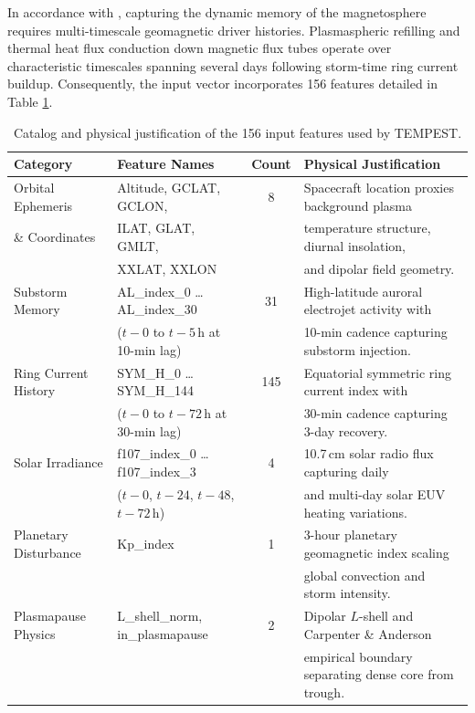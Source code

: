 \documentclass{agujournal2019}
\begin{document}
In accordance with \cite{dutta_statistical_2022}, capturing the dynamic memory of the magnetosphere requires multi-timescale geomagnetic driver histories. Plasmaspheric refilling and thermal heat flux conduction down magnetic flux tubes operate over characteristic timescales spanning several days following storm-time ring current buildup. Consequently, the input vector incorporates 156 features detailed in Table \ref{tab:features}.

\begin{table}[htbp]
    \centering
    \caption{Catalog and physical justification of the 156 input features used by TEMPEST.}
    \begin{tabular}{llcp{6.5cm}}
        \toprule
        Category & Feature Names & Count & Physical Justification \\
        \midrule
        Orbital Ephemeris & Altitude, GCLAT, GCLON, & 8 & Spacecraft location proxies background plasma \\
        \& Coordinates & ILAT, GLAT, GMLT, & & temperature structure, diurnal insolation, \\
        & XXLAT, XXLON & & and dipolar field geometry. \\
        Substorm Memory & AL\_index\_0 \dots AL\_index\_30 & 31 & High-latitude auroral electrojet activity with \\
        & ($t-0$ to $t-5$\,h at 10-min lag) & & 10-min cadence capturing substorm injection. \\
        Ring Current History & SYM\_H\_0 \dots SYM\_H\_144 & 145 & Equatorial symmetric ring current index with \\
        & ($t-0$ to $t-72$\,h at 30-min lag) & & 30-min cadence capturing 3-day recovery. \\
        Solar Irradiance & f107\_index\_0 \dots f107\_index\_3 & 4 & 10.7\,cm solar radio flux capturing daily \\
        & ($t-0$, $t-24$, $t-48$, $t-72$\,h) & & and multi-day solar EUV heating variations. \\
        Planetary Disturbance & Kp\_index & 1 & 3-hour planetary geomagnetic index scaling \\
        & & & global convection and storm intensity. \\
        Plasmapause Physics & L\_shell\_norm, in\_plasmapause & 2 & Dipolar $L$-shell and Carpenter \& Anderson \\
        & & & empirical boundary separating dense core from trough. \\
        \bottomrule
    \end{tabular}
    \label{tab:features}
\end{table}
\end{document}
